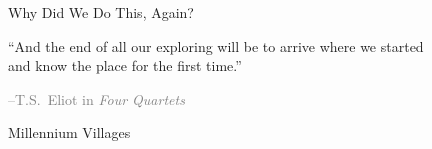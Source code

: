 \documentclass[10pt,xcolor=table,ignorenonframetext,handout,aspectratio=169]{beamer}
\begin{document}
\begin{frame}{Why Did We Do This, Again?}

\begin{footnotesize}
	
\begin{center}
	
``And the end of all our exploring
will be to arrive where we started \\
and know the place for the first time.''


\end{center}


\begin{flushright}
\textcolor{gray}{--T.S.~Eliot in \emph{Four Quartets}}
\end{flushright}
	
\end{footnotesize}

\end{frame}




\begin{frame}[plain]


\begin{center}
	
	\Large{\textcolor{williams}{Millennium Villages}}
	
\end{center}

\end{frame}


\end{document}
